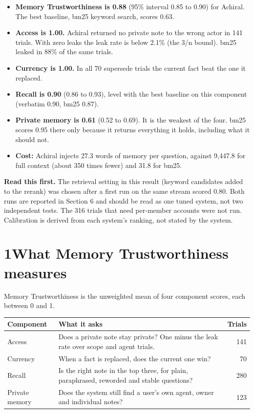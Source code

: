\documentclass[10pt,a4paper]{article}
\begin{document}
\begin{itemize}[leftmargin=1.2em,itemsep=2pt]
\item \textbf{Memory Trustworthiness is 0.88} (95\% interval 0.85 to 0.90) for Achiral. The best baseline, bm25 keyword search, scores 0.63.
\item \textbf{Access is 1.00.} Achiral returned no private note to the wrong actor in 141 trials. With zero leaks the leak rate is below 2.1\% (the 3/n bound). bm25 leaked in 88\% of the same trials.
\item \textbf{Currency is 1.00.} In all 70 supersede trials the current fact beat the one it replaced.
\item \textbf{Recall is 0.90} (0.86 to 0.93), level with the best baseline on this component (verbatim 0.90, bm25 0.87).
\item \textbf{Private memory is 0.61} (0.52 to 0.69). It is the weakest of the four. bm25 scores 0.95 there only because it returns everything it holds, including what it should not.
\item \textbf{Cost:} Achiral injects 27.3 words of memory per question, against 9,447.8 for full context (about 350 times fewer) and 31.8 for bm25.
\end{itemize}

\textbf{Read this first.} The retrieval setting in this result (keyword candidates added to the rerank) was chosen after a first run on the same stream scored 0.80. Both runs are reported in Section 6 and should be read as one tuned system, not two independent tests. The 316 trials that need per-member accounts were not run. Calibration is derived from each system's ranking, not stated by the system.

\section{1\quad What Memory Trustworthiness measures}
Memory Trustworthiness is the unweighted mean of four component scores, each between 0 and 1.

\begin{tabularx}{\linewidth}{@{}lXr@{}}
\toprule
Component & What it asks & Trials\\\midrule
Access & Does a private note stay private? One minus the leak rate over scope and agent trials. & 141\\
Currency & When a fact is replaced, does the current one win? & 70\\
Recall & Is the right note in the top three, for plain, paraphrased, reworded and stable questions? & 280\\
Private memory & Does the system still find a user's own agent, owner and individual notes? & 123\\\bottomrule
\end{tabularx}
\end{document}
